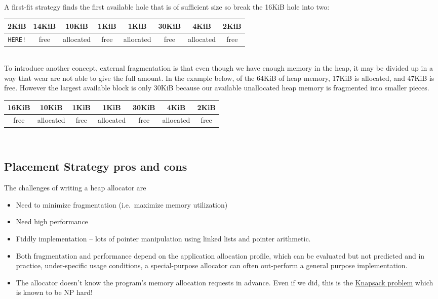 \\
A first-fit strategy finds the first available hole that is of sufficient size so break the 16KiB hole into two:
\\
\begin{center}
\begin{tabular}{ | c | c | c | c | c | c | c | c | }
\hline
2KiB & 14KiB & 10KiB & 1KiB & 1KiB & 30KiB & 4KiB & 2KiB \\ \hline
\texttt{HERE!} & free & allocated & free & allocated & free & allocated & free \\
\hline
\end{tabular}
\end{center}
\\

To introduce another concept, external fragmentation is that even though we have enough memory in the heap, it may be divided up in a way that wear are not able to give the full amount.
In the example below, of the 64KiB of heap memory, 17KiB is allocated, and 47KiB is free.
However the largest available block is only 30KiB because our available unallocated heap memory is fragmented into smaller pieces.
\\
\begin{center}
\begin{tabular}{ | c | c | c | c | c | c | c | }
\hline
16KiB & 10KiB & 1KiB & 1KiB & 30KiB & 4KiB & 2KiB \\ \hline
free & allocated & free & allocated & free & allocated & free \\
\hline
\end{tabular}
\end{center}
\\

\subsection{Placement Strategy pros and cons}

The challenges of writing a heap allocator are
\begin{itemize}
\item Need to minimize fragmentation (i.e.~maximize memory utilization)
\item Need high performance
\item Fiddly implementation -- lots of pointer manipulation using linked lists and pointer arithmetic.
\item Both fragmentation and performance depend on the application allocation profile, which can be evaluated but not predicted and in practice, under-specific usage conditions, a special-purpose allocator can often out-perform a general purpose implementation.
\item The allocator doesn't know the program's memory allocation requests in advance. Even if we did, this is the \href{http://en.wikipedia.org/wiki/Knapsack_problem}{Knapsack problem} which is known to be NP hard!
\end{itemize}

